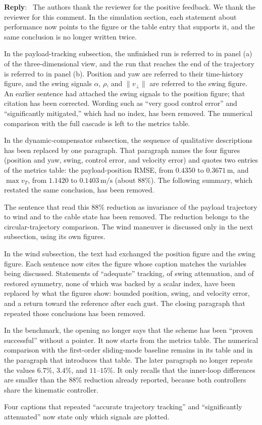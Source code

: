 \documentclass[11pt]{article}
\newcounter{reviewer}
\newcounter{point}[reviewer]
\newenvironment{reply}
   {\medskip \noindent \color{blue} \begin{sf}\textbf{Reply}:\  }
   {\medskip \par \end{sf}}
\begin{document}
\begin{reply}
The authors thank the reviewer for the positive feedback. We thank the reviewer for this comment. In the simulation section, each statement about performance now points to the figure or the table entry that supports it, and the same conclusion is no longer written twice.

In the payload-tracking subsection, the unfinished run is referred to in panel (a) of the three-dimensional view, and the run that reaches the end of the trajectory is referred to in panel (b). Position and yaw are referred to their time-history figure, and the swing signals $\alpha$, $\rho$, and $\|v_\perp\|$ are referred to the swing figure. An earlier sentence had attached the swing signals to the position figure; that citation has been corrected. Wording such as ``very good control error'' and ``significantly mitigated,'' which had no index, has been removed. The numerical comparison with the full cascade is left to the metrics table.

In the dynamic-compensator subsection, the sequence of qualitative descriptions has been replaced by one paragraph. That paragraph names the four figures (position and yaw, swing, control error, and velocity error) and quotes two entries of the metrics table: the payload-position RMSE, from $0.4350$ to $0.3671\,\mathrm{m}$, and $\max v_T$, from $1.1420$ to $0.1403\,\mathrm{m/s}$ (about $88\%$). The following summary, which restated the same conclusion, has been removed.

The sentence that read this $88\%$ reduction as invariance of the payload trajectory to wind and to the cable state has been removed. The reduction belongs to the circular-trajectory comparison. The wind maneuver is discussed only in the next subsection, using its own figures.

In the wind subsection, the text had exchanged the position figure and the swing figure. Each sentence now cites the figure whose caption matches the variables being discussed. Statements of ``adequate'' tracking, of swing attenuation, and of restored symmetry, none of which was backed by a scalar index, have been replaced by what the figures show: bounded position, swing, and velocity error, and a return toward the reference after each gust. The closing paragraph that repeated those conclusions has been removed.

In the benchmark, the opening no longer says that the scheme has been ``proven successful'' without a pointer. It now starts from the metrics table. The numerical comparison with the first-order sliding-mode baseline remains in its table and in the paragraph that introduces that table. The later paragraph no longer repeats the values $6.7\%$, $3.4\%$, and $11$--$15\%$. It only recalls that the inner-loop differences are smaller than the $88\%$ reduction already reported, because both controllers share the kinematic controller.

Four captions that repeated ``accurate trajectory tracking'' and ``significantly attenuated'' now state only which signals are plotted.
\end{reply}
\end{document}
